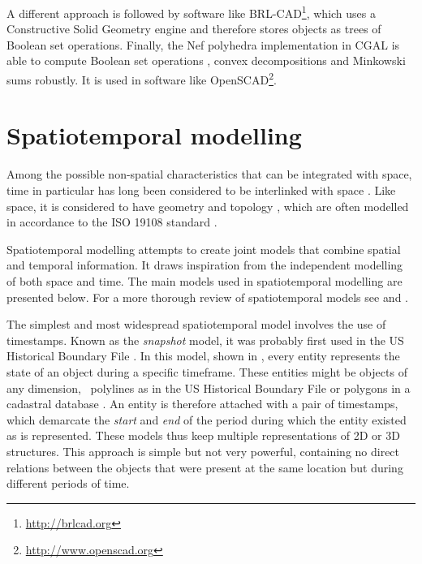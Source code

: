 A different approach is followed by software like BRL-CAD\footnote{\url{http://brlcad.org}}, which uses a Constructive Solid Geometry engine and therefore stores objects as trees of Boolean set operations.
Finally, the Nef polyhedra implementation in CGAL \citep{Hachenberger06} is able to compute Boolean set operations \citep{Granados03}, convex decompositions \citep{Chazelle84} and Minkowski sums robustly.
It is used in software like OpenSCAD\footnote{\url{http://www.openscad.org}}.

\section{Spatiotemporal modelling}
\label{se:modelling-time}

Among the possible non-spatial characteristics that can be integrated with space, time in particular has long been considered to be interlinked with space \citep{Akhundov86}.
Like space, it is considered to have geometry and topology \citep{Earman77}, which are often modelled in accordance to the ISO 19108 standard \citep{ISO19108:2002}.

Spatiotemporal modelling attempts to create joint models that combine spatial and temporal information.
It draws inspiration from the independent modelling of both space and time.
The main models used in spatiotemporal modelling are presented below.
For a more thorough review of spatiotemporal models see \citet{Al-Taha94} and \citet{Pelekis04}.

The simplest and most widespread spatiotemporal model involves the use of timestamps.
Known as the \emph{snapshot} model, it was probably first used in the US Historical Boundary File \citep{Basoglu78}.
In this model, shown in , every entity represents the state of an object during a specific timeframe.
These entities might be objects of any dimension, \eg\ polylines as in the US Historical Boundary File or polygons in a cadastral database \citep{Hunter90}.
An entity is therefore attached with a pair of timestamps, which demarcate the \emph{start} and \emph{end} of the period during which the entity existed as is represented.
These models thus keep multiple representations of 2D \citep{Armstrong88} or 3D \citep{Hamre97} structures.
This approach is simple but not very powerful, containing no direct relations between the objects that were present at the same location but during different periods of time.

